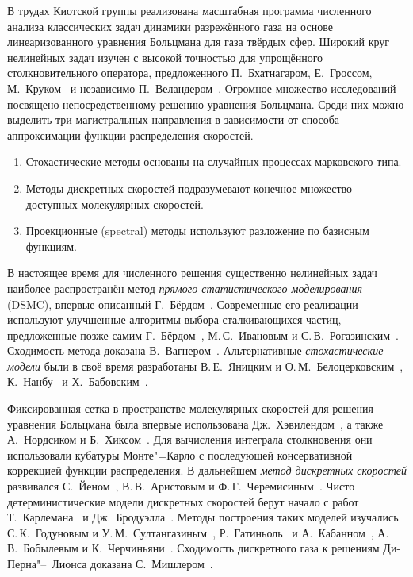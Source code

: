 В трудах Киотской группы реализована масштабная программа численного анализа классических задач
динамики разрежённого газа на основе линеаризованного уравнения Больцмана для газа твёрдых сфер.
Широкий круг нелинейных задач изучен с высокой точностью для упрощённого столкновительного оператора,
предложенного П.~Бхатнагаром, Е.~Гроссом, М.~Круком~\autocite{Krook1954} и независимо П.~Веландером~\autocite{Welander1954}.
Огромное множество исследований посвящено непосредственному решению уравнения Больцмана.
Среди них можно выделить три магистральных направления в зависимости от способа аппроксимации
функции распределения скоростей.
\begin{enumerate}
    \item Стохастические методы основаны на случайных процессах марковского типа.
    \item Методы дискретных скоростей подразумевают конечное множество доступных молекулярных скоростей.
    \item Проекционные (spectral) методы используют разложение по базисным функциям.
\end{enumerate}

В настоящее время для численного решения существенно нелинейных задач наиболее распространён
метод \emph{прямого статистического моделирования} (DSMC),
впервые описанный Г.~Бёрдом~\autocite{Bird1963}.
Современные его реализации используют улучшенные алгоритмы выбора сталкивающихся частиц,
предложенные позже самим Г.~Бёрдом~\autocite{Bird1989}, М.\,С.~Ивановым и С.\,В.~Рогазинским~\autocite{Ivanov1988}.
Сходимость метода доказана В.~Вагнером~\autocite{Wagner1992}.
Альтернативные \emph{стохастические модели} были в своё время разработаны
В.\,Е.~Яницким и О.\,М.~Белоцерковским~\autocite{Yanitskij1975},
К.~Нанбу~\autocite{Nanbu1980} и Х.~Бабовским~\autocite{Babovsky1986}.

Фиксированная сетка в пространстве молекулярных скоростей для решения уравнения Больцмана
была впервые использована Дж.~Хэвилендом~\autocite{Haviland1965, Haviland1970},
а также А.~Нордсиком и Б.~Хиксом~\autocite{Nordsieck1966, Nordsieck1970}.
Для вычисления интеграла столкновения они использовали кубатуры Монте"=Карло с последующей
консервативной коррекцией функции распределения.
В дальнейшем \emph{метод дискретных скоростей} развивался С.~Йеном~\autocite{Yen1984},
В.\,В.~Аристовым и Ф.\,Г.~Черемисиным~\autocite{Tcheremissine1980}.
Чисто детерминистические модели дискретных скоростей берут начало с работ
Т.~Карлемана~\autocite{Carleman1957} и Дж.~Бродуэлла~\autocite{Broadwell1964shock, Broadwell1964shear}.
Методы построения таких моделей изучались С.\,К.~Годуновым и У.\,М.~Султангазиным~\autocite{Sultangazin1971},
Р.~Гатиньоль~\autocite{Gatignol1975} и А.~Кабанном~\autocite{Cabannes1980},
А.\,В.~Бобылевым и К.~Черчиньяни~\autocite{Bobylev1999dvm}.
Сходимость дискретного газа к решениям Ди-Перна"--~Лионса доказана С.~Мишлером~\autocite{Mischler1997}.

